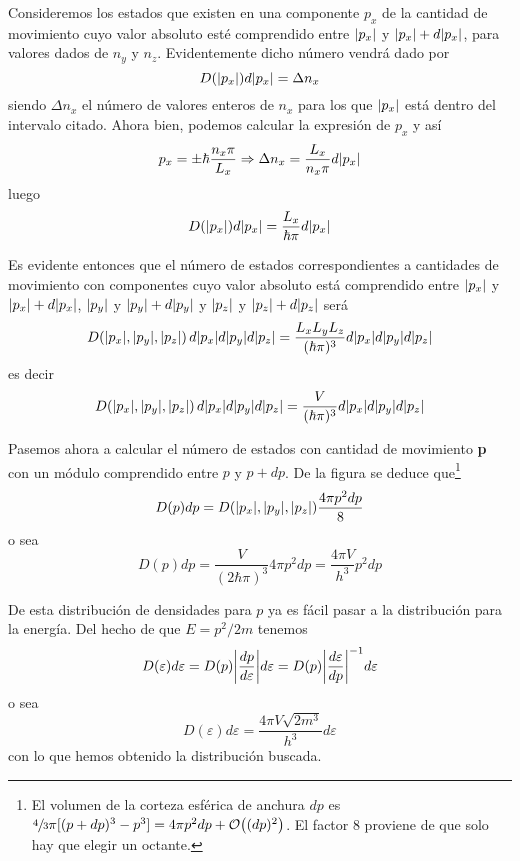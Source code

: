 Consideremos los estados que existen en una componente $p_x$ de la cantidad de
movimiento cuyo valor absoluto esté comprendido entre $\abs{p_x}$ y $\abs{p_x} + d\abs{p_x}$, para valores
dados de $n_y$ y $n_z$.
Evidentemente dicho número vendrá dado por
\begin{equation}
	D(\abs{p_x}) d\abs{p_x} = \Delta n_x
\end{equation}
siendo $\Delta n_x$ el número de valores enteros de $n_x$ para los que $\abs{p_x}$ está dentro del intervalo citado.
Ahora bien, podemos calcular la expresión de $p_x$ y así
\begin{equation}
	p_x = \pm\hbar\frac{n_x\pi}{L_x} \Rightarrow \Delta n_x = \frac{L_x}{n_x\pi}d\abs{p_x}
\end{equation}
luego
\begin{equation}
	D(\abs{p_x}) d\abs{p_x} = \frac{L_x}{\hbar\pi}d\abs{p_x}
\end{equation}

Es evidente entonces que el número de estados correspondientes a cantidades de movimiento con componentes cuyo valor absoluto está comprendido entre $\abs{p_x}$ y $\abs{p_x} + d\abs{p_x}$, $\abs{p_y}$ y $\abs{p_y} + d\abs{p_y}$ y $\abs{p_z}$ y $\abs{p_z} + d\abs{p_z}$ será
\begin{equation}
	D(\abs{p_x}, \abs{p_y}, \abs{p_z}) \, d\abs{p_x} d\abs{p_y} d\abs{p_z}= \frac{L_xL_yL_z}{(\hbar\pi)^3} d\abs{p_x} d\abs{p_y} d\abs{p_z}
\end{equation}
es decir
\begin{equation}
	D(\abs{p_x}, \abs{p_y}, \abs{p_z}) \, d\abs{p_x} d\abs{p_y} d\abs{p_z}= \frac{V}{(\hbar\pi)^3} d\abs{p_x} d\abs{p_y} d\abs{p_z}
\end{equation}

Pasemos ahora a calcular el número de estados con cantidad de movimiento \textbf{p} con un módulo comprendido entre $p$ y $p+dp$.
De la figura se deduce que\footnote{El volumen de la corteza esférica de anchura $dp$ es $\sfrac{4}{3}\pi[(p + dp)^3 - p^3]=4\pi p^2 dp + \order{(dp)^2}$. El factor 8 proviene de que solo hay que elegir un octante.}
\begin{equation}
	D(p)dp = D(\abs{p_x}, \abs{p_y}, \abs{p_z}) \frac{4\pi p^2 dp}{8}
\end{equation}
o sea
\begin{equation}
	D(p)dp = \frac{V}{(2\hbar\pi)^3}4\pi p^2 dp = \frac{4\pi V}{h^3} p^2 dp
\end{equation}

De esta distribución de densidades para $p$ ya es fácil pasar a la distribución para la energía.
Del hecho de que $E = p^2/2m$ tenemos
\begin{equation}
	D(\varepsilon) d\varepsilon = D(p)\abs{\frac{dp}{d\varepsilon}}d\varepsilon = D(p) \abs{\frac{d\varepsilon}{dp}}^{-1} d\varepsilon
\end{equation}
o sea
\begin{equation}\label{eq:D_vareps}
	D(\varepsilon) d\varepsilon = \frac{4\pi V\sqrt{2m^3}}{h^3} d\varepsilon
\end{equation}
con lo que hemos obtenido la distribución buscada.


